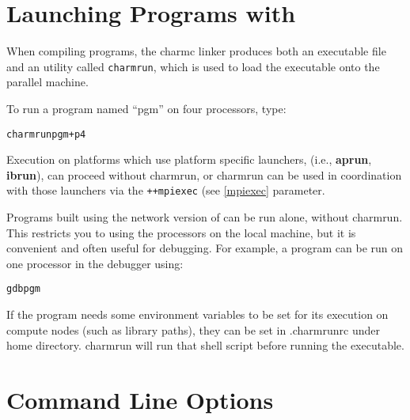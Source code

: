 \section{Launching Programs with }
\label{charmrun}

When compiling \charmpp{} programs, the charmc linker produces
both an executable file and an utility called {\tt charmrun},
which is used to load the executable onto the parallel machine.

To run a \charmpp{} program named ``pgm'' on four processors, type:
\begin{alltt}
charmrun pgm +p4
\end{alltt}

Execution on platforms which use platform specific launchers, (i.e.,
{\bf aprun}, {\bf ibrun}), can proceed without charmrun, or charmrun can be used
in coordination with those launchers via the {\tt ++mpiexec} (see
\ref{mpiexec} parameter.

Programs built using the network version of \charmpp{} can be run
alone, without charmrun.  This restricts you to using the processors
on the local machine, but it is convenient and often useful for
debugging.  For example, a \charmpp{} program can be run on one
processor in the debugger using:

\begin{alltt}
gdb pgm
\end{alltt}

If the program needs some environment variables
to be set for its execution on compute nodes
(such as library paths), they can be set in
.charmrunrc under home directory. charmrun
will run that shell script before running the executable.

\section[Command Line Options]{Command Line Options}
\label{command line options}

